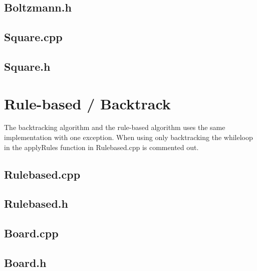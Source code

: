 \documentclass[a4paper,11pt]{kth-mag}
\begin{document}
\subsection{Boltzmann.h}


\subsection{Square.cpp}

\subsection{Square.h}


\section{Rule-based / Backtrack}
The backtracking algorithm and the rule-based algorithm uses the same implementation with one exception. When using only backtracking the whileloop in the applyRules function in Rulebased.cpp is commented out.
\subsection{Rulebased.cpp}

\subsection{Rulebased.h}

\subsection{Board.cpp}

\subsection{Board.h}

\end{document}
